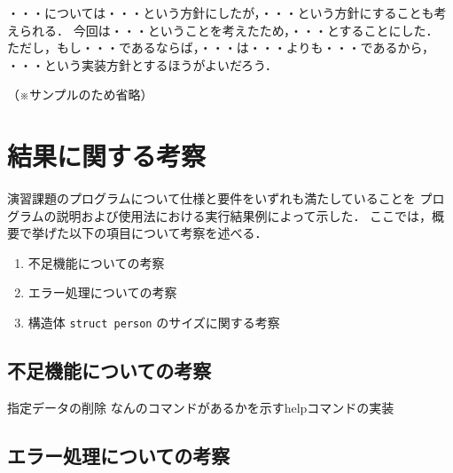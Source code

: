 \documentclass[a4j,11pt]{jarticle}
\begin{document}
・・・については・・・という方針にしたが，・・・という方針にすることも考えられる．
今回は・・・ということを考えたため，・・・とすることにした．
ただし，もし・・・であるならば，・・・は・・・よりも・・・であるから，
・・・という実装方針とするほうがよいだろう．

（※サンプルのため省略）


\section{結果に関する考察}


演習課題のプログラムについて仕様と要件をいずれも満たしていることを
プログラムの説明および使用法における実行結果例によって示した．
ここでは，概要で挙げた以下の項目について考察を述べる．

\begin{enumerate}
\setlength{\parskip}{2pt} \setlength{\itemsep}{2pt}
    \item 不足機能についての考察
    \item エラー処理についての考察
    \item 構造体 \verb|struct person| のサイズに関する考察
\end{enumerate}

\subsection{不足機能についての考察}

指定データの削除
なんのコマンドがあるかを示すhelpコマンドの実装

\subsection{エラー処理についての考察}
\end{document}
